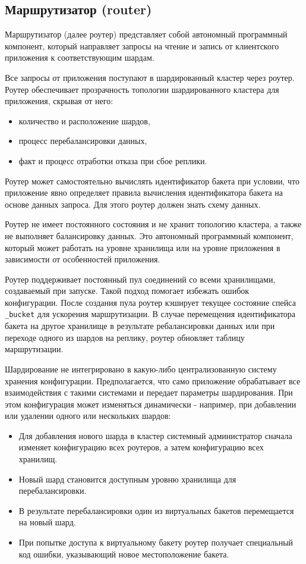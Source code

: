 \subsection{Маршрутизатор (router)}

Маршрутизатор (далее роутер) представляет собой автономный программный
компонент, который направляет запросы на чтение и запись от клиентского
приложения к соответствующим шардам.

Все запросы от приложения поступают в шардированный кластер через роутер.
Роутер обеспечивает прозрачность топологии шардированного кластера для
приложения, скрывая от него:

\begin{itemize}
\item количество и расположение шардов,
\item процесс перебалансировки данных,
\item факт и процесс отработки отказа при сбое реплики.
\end{itemize}

Роутер может самостоятельно вычислять идентификатор бакета при условии, что
приложение явно определяет правила вычисления идентификатора бакета на основе
данных запроса. Для этого роутер должен знать схему данных.

Роутер не имеет постоянного состояния и не хранит топологию кластера, а также
не выполняет балансировку данных. Это автономный программный компонент, который
может работать на уровне хранилища или на уровне приложения в зависимости от
особенностей приложения.

Роутер поддерживает постоянный пул соединений со всеми хранилищами, создаваемый
при запуске. Такой подход помогает избежать ошибок конфигурации. После создания
пула роутер кэширует текущее состояние спейса \texttt{\_bucket} для ускорения
маршрутизации. В случае перемещения идентификатора бакета на другое хранилище в
результате ребалансировки данных или при переходе одного из шардов на реплику,
роутер обновляет таблицу маршрутизации.

Шардирование не интегрировано в какую-либо централизованную систему хранения
конфигурации. Предполагается, что само приложение обрабатывает все
взаимодействия с такими системами и передает параметры шардирования. При этом
конфигурация может изменяться динамически - например, при добавлении или
удалении одного или нескольких шардов:

\begin{itemize}
\item Для добавления нового шарда в кластер системный администратор сначала
    изменяет конфигурацию всех роутеров, а затем конфигурацию всех хранилищ.
\item Новый шард становится доступным уровню хранилища для перебалансировки.
\item В результате перебалансировки один из виртуальных бакетов перемещается на
    новый шард.
\item При попытке доступа к виртуальному бакету роутер получает специальный код
    ошибки, указывающий новое местоположение бакета.
\end{itemize}

